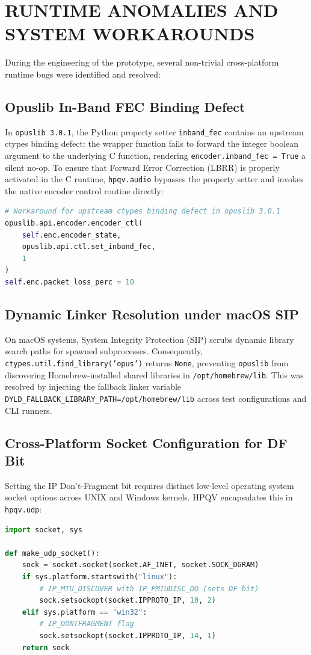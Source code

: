 \section{RUNTIME ANOMALIES AND SYSTEM WORKAROUNDS}
During the engineering of the prototype, several non-trivial cross-platform runtime bugs were identified and resolved:

\subsection{Opuslib In-Band FEC Binding Defect}
In \texttt{opuslib 3.0.1}, the Python property setter \texttt{inband\_fec} contains an upstream ctypes binding defect: the wrapper function fails to forward the integer boolean argument to the underlying C function, rendering \texttt{encoder.inband\_fec = True} a silent no-op. To ensure that Forward Error Correction (LBRR) is properly activated in the C runtime, \texttt{hpqv.audio} bypasses the property setter and invokes the native encoder control routine directly:
\begin{lstlisting}[language=Python]
# Workaround for upstream ctypes binding defect in opuslib 3.0.1
opuslib.api.encoder.encoder_ctl(
    self.enc.encoder_state, 
    opuslib.api.ctl.set_inband_fec, 
    1
)
self.enc.packet_loss_perc = 10
\end{lstlisting}

\subsection{Dynamic Linker Resolution under macOS SIP}
On macOS systems, System Integrity Protection (SIP) scrubs dynamic library search paths for spawned subprocesses. Consequently, \texttt{ctypes.util.find\_library('opus')} returns \texttt{None}, preventing \texttt{opuslib} from discovering Homebrew-installed shared libraries in \texttt{/opt/homebrew/lib}. This was resolved by injecting the fallback linker variable \texttt{DYLD\_FALLBACK\_LIBRARY\_PATH=/opt/homebrew/lib} across test configurations and CLI runners.

\subsection{Cross-Platform Socket Configuration for DF Bit}
Setting the IP Don't-Fragment bit requires distinct low-level operating system socket options across UNIX and Windows kernels. HPQV encapsulates this in \texttt{hpqv.udp}:
\begin{lstlisting}[language=Python]
import socket, sys

def make_udp_socket():
    sock = socket.socket(socket.AF_INET, socket.SOCK_DGRAM)
    if sys.platform.startswith("linux"):
        # IP_MTU_DISCOVER with IP_PMTUDISC_DO (sets DF bit)
        sock.setsockopt(socket.IPPROTO_IP, 10, 2)
    elif sys.platform == "win32":
        # IP_DONTFRAGMENT flag
        sock.setsockopt(socket.IPPROTO_IP, 14, 1)
    return sock
\end{lstlisting}

